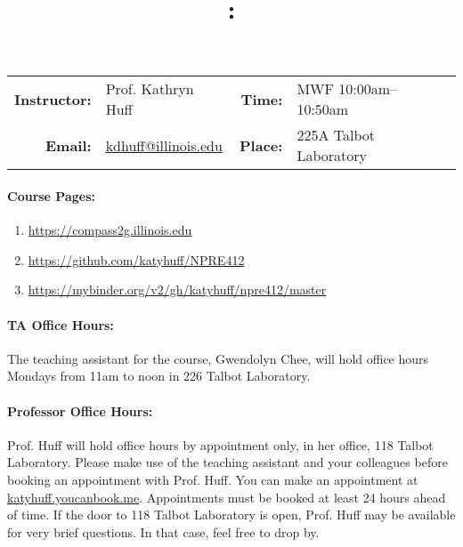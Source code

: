 \documentclass[11pt, a4paper]{article}
\title{\CourseNumber: \CourseTitle\\}
\author{\CourseUniversity}
\date{\CourseSemester \CourseYear}
\makeatletter
\newcommand{\CourseNumber}{NPRE412}
\newcommand{\CourseInstructor}{Prof. Kathryn Huff\xspace}%
\newcommand{\CourseDays}{MWF\xspace}%
\newcommand{\CourseStart}{10:00am\xspace}%
\newcommand{\CourseEnd}{10:50am\xspace}%
\newcommand{\CourseInstructorEmail}{kdhuff@illinois.edu}
\newcommand{\HuffOfficeHourPlace}{118 Talbot Laboratory\xspace}
\newcommand{\CourseRoom}{225A\xspace}%
\newcommand{\CourseBuilding}{Talbot Laboratory\xspace}%
\newcommand{\TeachingAssistant}{Gwendolyn Chee\xspace}%
\newcommand{\TAOfficeHourDays}{Mondays\xspace}%
\newcommand{\TAOfficeHourStart}{11am\xspace}%
\newcommand{\TAOfficeHourEnd}{noon\xspace}%
\newcommand{\TAOfficeHourPlace}{226 Talbot Laboratory\xspace}
\makeatother
\begin{document}
\maketitle
\renewcommand{\arraystretch}{1.5}
\begin{center}
\begin{table}[h]
\begin{tabularx}{\textwidth}{rXrX}
\hline
\textbf{Instructor:} & \CourseInstructor & \textbf{Time:} & \CourseDays \CourseStart -- \CourseEnd \\
\textbf{Email:} &  \href{mailto:\CourseInstructorEmail}{\CourseInstructorEmail} & \textbf{Place:} & \CourseRoom \CourseBuilding\\
\hline
\end{tabularx}
\end{table}
\end{center}

\paragraph{Course Pages:}
\begin{enumerate}
        \item \url{https://compass2g.illinois.edu}
        \item \url{https://github.com/katyhuff/\CourseNumber}
        \item \url{https://mybinder.org/v2/gh/katyhuff/npre412/master}
\end{enumerate}

\paragraph{TA Office Hours:} The teaching assistant for the course, 
\TeachingAssistant, will hold office hours \TAOfficeHourDays from 
\TAOfficeHourStart to \TAOfficeHourEnd in \TAOfficeHourPlace.



\paragraph{Professor Office Hours:} Prof. Huff will hold office hours by appointment
only, in her office, \HuffOfficeHourPlace. Please make use of the teaching
assistant and your colleagues before booking an appointment with Prof. Huff.
You can make an appointment at \url{katyhuff.youcanbook.me}. Appointments 
must be booked at least 24 hours ahead of time.
If the door to \HuffOfficeHourPlace is open, Prof. Huff may be available for very brief 
questions. In that case, feel free to drop by.
\end{document}

